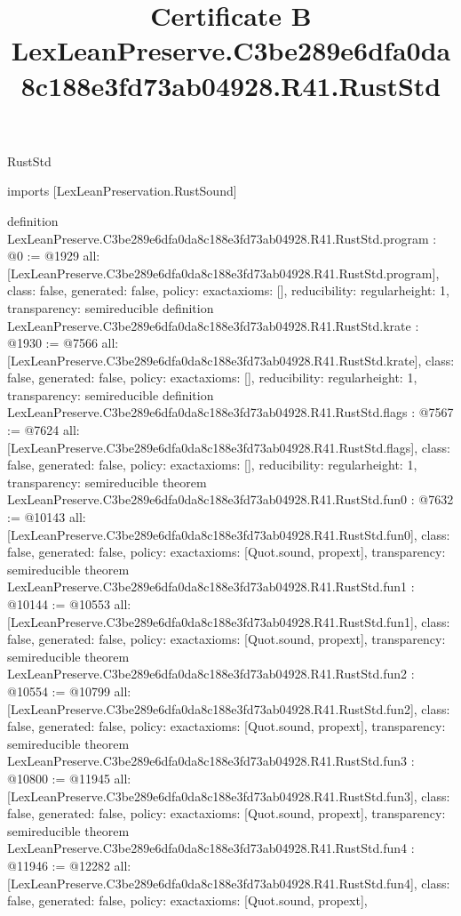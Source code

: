 \begin{lexlean}{RustStd}
\title{Certificate B LexLeanPreserve.C3be289e6dfa0da8c188e3fd73ab04928.R41.RustStd}
\begin{coremodule}
imports [LexLeanPreservation.RustSound]

definition LexLeanPreserve.C3be289e6dfa0da8c188e3fd73ab04928.R41.RustStd.program : @0 := @1929 {
  all: [LexLeanPreserve.C3be289e6dfa0da8c188e3fd73ab04928.R41.RustStd.program],
  class: false,
  generated: false,
  policy: exact{axioms: []},
  reducibility: regular{height: 1},
  transparency: semireducible
}
definition LexLeanPreserve.C3be289e6dfa0da8c188e3fd73ab04928.R41.RustStd.krate : @1930 := @7566 {
  all: [LexLeanPreserve.C3be289e6dfa0da8c188e3fd73ab04928.R41.RustStd.krate],
  class: false,
  generated: false,
  policy: exact{axioms: []},
  reducibility: regular{height: 1},
  transparency: semireducible
}
definition LexLeanPreserve.C3be289e6dfa0da8c188e3fd73ab04928.R41.RustStd.flags : @7567 := @7624 {
  all: [LexLeanPreserve.C3be289e6dfa0da8c188e3fd73ab04928.R41.RustStd.flags],
  class: false,
  generated: false,
  policy: exact{axioms: []},
  reducibility: regular{height: 1},
  transparency: semireducible
}
theorem LexLeanPreserve.C3be289e6dfa0da8c188e3fd73ab04928.R41.RustStd.fun0 : @7632 := @10143 {
  all: [LexLeanPreserve.C3be289e6dfa0da8c188e3fd73ab04928.R41.RustStd.fun0],
  class: false,
  generated: false,
  policy: exact{axioms: [Quot.sound, propext]},
  transparency: semireducible
}
theorem LexLeanPreserve.C3be289e6dfa0da8c188e3fd73ab04928.R41.RustStd.fun1 : @10144 := @10553 {
  all: [LexLeanPreserve.C3be289e6dfa0da8c188e3fd73ab04928.R41.RustStd.fun1],
  class: false,
  generated: false,
  policy: exact{axioms: [Quot.sound, propext]},
  transparency: semireducible
}
theorem LexLeanPreserve.C3be289e6dfa0da8c188e3fd73ab04928.R41.RustStd.fun2 : @10554 := @10799 {
  all: [LexLeanPreserve.C3be289e6dfa0da8c188e3fd73ab04928.R41.RustStd.fun2],
  class: false,
  generated: false,
  policy: exact{axioms: [Quot.sound, propext]},
  transparency: semireducible
}
theorem LexLeanPreserve.C3be289e6dfa0da8c188e3fd73ab04928.R41.RustStd.fun3 : @10800 := @11945 {
  all: [LexLeanPreserve.C3be289e6dfa0da8c188e3fd73ab04928.R41.RustStd.fun3],
  class: false,
  generated: false,
  policy: exact{axioms: [Quot.sound, propext]},
  transparency: semireducible
}
theorem LexLeanPreserve.C3be289e6dfa0da8c188e3fd73ab04928.R41.RustStd.fun4 : @11946 := @12282 {
  all: [LexLeanPreserve.C3be289e6dfa0da8c188e3fd73ab04928.R41.RustStd.fun4],
  class: false,
  generated: false,
  policy: exact{axioms: [Quot.sound, propext]},
}
\end{coremodule}
\end{lexlean}
